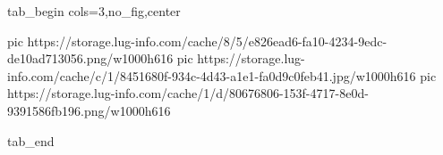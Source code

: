  
 
 
 
 


\ifcmt
  tab_begin cols=3,no_fig,center

     pic https://storage.lug-info.com/cache/8/5/e826ead6-fa10-4234-9edc-de10ad713056.png/w1000h616
		 pic https://storage.lug-info.com/cache/c/1/8451680f-934c-4d43-a1e1-fa0d9c0feb41.jpg/w1000h616
		 pic https://storage.lug-info.com/cache/1/d/80676806-153f-4717-8e0d-9391586fb196.png/w1000h616

  tab_end
\fi

